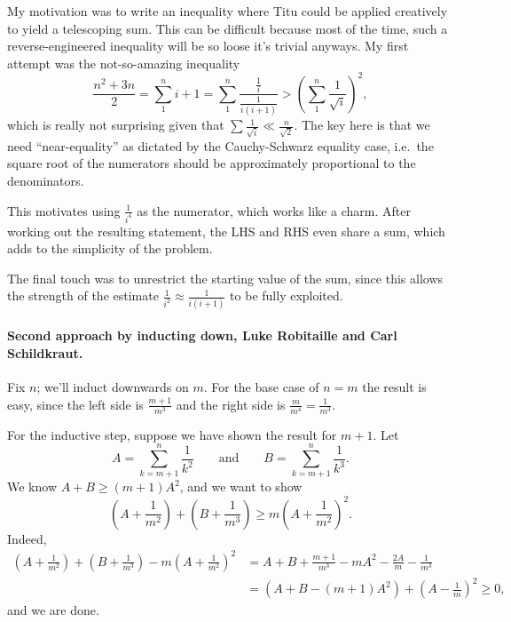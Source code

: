 \begin{remark*}
  My motivation was to write an inequality where
  Titu could be applied creatively to yield a telescoping sum.
  This can be difficult because most of the time,
  such a reverse-engineered inequality will be so loose it's trivial anyways.
  My first attempt was the not-so-amazing inequality
  \[\frac{n^2+3n}2=\sum_1^n i+1=\sum_1^n \frac{\frac1i}{\frac1{i(i+1)}}
    >\left( \sum_1^n \frac1{\sqrt i} \right)^2,\]
  which is really not surprising given that
  $\sum\frac1{\sqrt i}\ll \frac n{\sqrt2}$.
  The key here is that we need ``near-equality''
  as dictated by the Cauchy-Schwarz equality case,
  i.e.\ the square root of the numerators should be
  approximately proportional to the denominators.

  This motivates using $\frac1{i^4}$ as the numerator,
  which works like a charm. After working out the resulting statement,
  the LHS and RHS even share a sum,
  which adds to the simplicity of the problem.

  The final touch was to unrestrict the starting value of the sum,
  since this allows the strength of the estimate
  $\frac1{i^2}\approx\frac1{i(i+1)}$ to be fully exploited.
\end{remark*}

\paragraph{Second approach by inducting down, Luke Robitaille and Carl Schildkraut.}
Fix $n$; we'll induct downwards on $m$.
For the base case of $n=m$ the result is easy,
since the left side is $\frac{m+1}{m^3}$ and the right side is $\frac m{m^4}=\frac1{m^3}$.

For the inductive step, suppose we have shown the result for $m+1$.
Let
\[A=\sum_{k=m+1}^n\frac1{k^2}\qquad \text{and}\qquad B=\sum_{k=m+1}^n\frac1{k^3}.\]
We know $A+B\geq (m+1)A^2$, and we want to show
\[\left(A+\frac1{m^2}\right)+\left(B+\frac1{m^3}\right)\geq m\left(A+\frac1{m^2}\right)^2.\]
Indeed,
\begin{align*}
  \left(A+\frac1{m^2}\right)+\left(B+\frac1{m^3}\right)-m\left(A+\frac1{m^2}\right)^2
  &=A+B+\frac{m+1}{m^3}-mA^2-\frac{2A}m-\frac1{m^3}\\
  &=\left(A+B-(m+1)A^2\right)+\left(A-\frac1m\right)^2\geq 0,
\end{align*}
and we are done.



